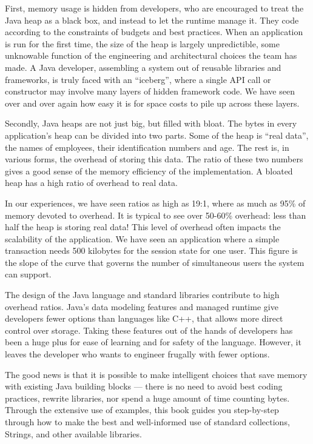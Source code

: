First, memory usage is hidden from developers, who are encouraged to treat the
Java heap as a black box, and instead
to let the runtime manage it. They code according to the constraints of
budgets and best practices. When an
application is run for the first time, the size of the heap is largely
unpredictible, some unknowable function of the engineering and architectural choices the team has made.
A Java developer, assembling a system out of reusable libraries and frameworks,
is truly faced with an ``iceberg'', where a single API call or constructor may
involve many layers of hidden framework code. We have seen over and over again
how easy it is for space costs to pile up across these layers.

Secondly, Java heaps
are not just big, but filled with bloat. The bytes in every application's heap can be divided into two
parts. Some of the heap is ``real data'', the names of employees, their
identification numbers and age. The rest is, in various forms, the overhead of
storing this data. The ratio of these two numbers gives a good sense of the
memory efficiency of the implementation. A bloated heap has a high ratio of
overhead to real data.

In our experiences, we have seen ratios as high as 19:1, where as much as 95\%
of memory devoted to overhead. It is typical to see over 50-60\% overhead: less
than half the heap is storing real data! This level of overhead often impacts the scalability of 
the application. We have
seen an application where a simple transaction needs 500 kilobytes for the
session state for one user. This figure is the slope of the curve that governs
the number of simultaneous users the system can support.  

The design of the Java language and standard libraries contribute to high
overhead ratios. Java's data modeling features and managed runtime give
developers fewer options than languages like C++, that allows more direct control over
storage. Taking these features out of the hands of developers has been a huge
plus for ease of learning and for safety of the language. However, it leaves the
developer who wants to engineer frugally with fewer options. 

The good news is that it is possible to make intelligent choices that save
memory with existing Java building blocks --- there is no need to avoid best
coding practices, rewrite libraries, nor spend a huge amount of time counting
bytes. Through the extensive use of examples, this book guides you step-by-step 
 through how to make the best and well-informed use of standard collections,
 Strings, and other available libraries.

